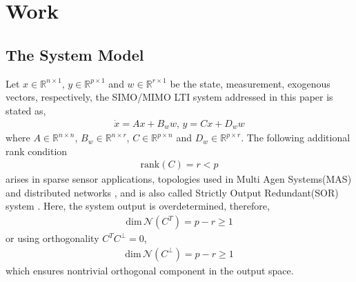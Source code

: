 \section{Work}
\subsection{The System Model}
Let $x\in\mathbb{R}^{n\times 1}$, $y\in\mathbb{R}^{p\times 1}$ and $w\in\mathbb{R}^{r\times 1}$ be the state, measurement, exogenous vectors, respectively, the SIMO/MIMO LTI system addressed in this paper is stated as, 
\begin{gather} 
    \dot{x}=A x+B_w w,\,y=C x+D_w w
\end{gather}
where $A\in\mathbb{R}^{n\times n}$, $B_w\in\mathbb{R}^{n\times r}$, $C\in\mathbb{R}^{p\times n}$ and $D_w\in\mathbb{R}^{p\times r}$. The following additional rank condition
\begin{gather}
    \mathrm{rank}(C)=r<p
\end{gather}
arises in sparse sensor applications\cite{shoukry2015event}, topologies used in Multi Agen Systems(MAS)\cite{olfati2007consensus} and distributed networks \cite{yang2022sensor}, and is also called Strictly Output Redundant(SOR) system \cite{yang2025output}. Here, the system output is overdetermined, therefore, 
\begin{gather}  
    \mathrm{dim}\,\mathcal{N}(C^T)=p-r\geq 1
\end{gather}  
or using orthogonality $C^TC^\perp=0$,
\begin{gather}  
    \mathrm{dim}\,\mathcal{N}(C^\perp)=p-r\geq 1
\end{gather}  
which ensures nontrivial orthogonal component in the output space. 
